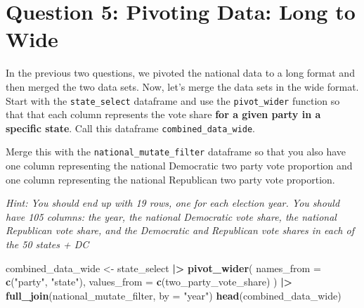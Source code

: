 \documentclass[
]{article}
\newenvironment{Shaded}{\begin{snugshade}}{\end{snugshade}}
\newcommand{\AttributeTok}[1]{\textcolor[rgb]{0.13,0.29,0.53}{#1}}
\newcommand{\FunctionTok}[1]{\textcolor[rgb]{0.13,0.29,0.53}{\textbf{#1}}}
\newcommand{\NormalTok}[1]{#1}
\newcommand{\OtherTok}[1]{\textcolor[rgb]{0.56,0.35,0.01}{#1}}
\newcommand{\SpecialCharTok}[1]{\textcolor[rgb]{0.81,0.36,0.00}{\textbf{#1}}}
\newcommand{\StringTok}[1]{\textcolor[rgb]{0.31,0.60,0.02}{#1}}
\begin{document}
\section{Question 5: Pivoting Data: Long to
Wide}\label{question-5-pivoting-data-long-to-wide}

In the previous two questions, we pivoted the national data to a long
format and then merged the two data sets. Now, let's merge the data sets
in the wide format. Start with the \texttt{state\_select} dataframe and
use the \texttt{pivot\_wider} function so that that each column
represents the vote share \textbf{for a given party in a specific
state}. Call this dataframe \texttt{combined\_data\_wide}.

Merge this with the \texttt{national\_mutate\_filter} dataframe so that
you also have one column representing the national Democratic two party
vote proportion and one column representing the national Republican two
party vote proportion.

\emph{Hint: You should end up with 19 rows, one for each election year.
You should have 105 columns: the year, the national Democratic vote
share, the national Republican vote share, and the Democratic and
Republican vote shares in each of the 50 states + DC}

\begin{Shaded}
\begin{Highlighting}[]
\NormalTok{combined\_data\_wide }\OtherTok{\textless{}{-}}\NormalTok{ state\_select }\SpecialCharTok{|\textgreater{}}
  \FunctionTok{pivot\_wider}\NormalTok{(}
    \AttributeTok{names\_from =} \FunctionTok{c}\NormalTok{(}\StringTok{"party"}\NormalTok{, }\StringTok{"state"}\NormalTok{), }\AttributeTok{values\_from =} \FunctionTok{c}\NormalTok{(two\_party\_vote\_share)}
\NormalTok{  ) }\SpecialCharTok{|\textgreater{}}
  \FunctionTok{full\_join}\NormalTok{(national\_mutate\_filter, }\AttributeTok{by =} \StringTok{"year"}\NormalTok{)}
\FunctionTok{head}\NormalTok{(combined\_data\_wide)}
\end{Highlighting}
\end{Shaded}
\end{document}
